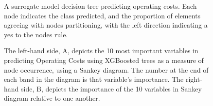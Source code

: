 \documentclass[review,12pt,authoryear]{elsarticle}
\begin{document}
\begin{linenumbers}
\begin{figure} 
  \caption{A surrogate model decision tree predicting operating costs. Each node indicates the class predicted, and the proportion of elements agreeing with nodes partitioning, with the left direction indicating a yes to the nodes rule.}\label{fig:operating_tree}
 \end{figure}

\begin{figure}
  \caption{The left-hand side, A,  depicts the 10 most important variables in predicting Operating Costs using XGBoosted trees as a measure of node occurrence, using a Sankey diagram. The number at the end of each band in the diagram is that variable's importance. The right-hand side, B, depicts the importance of the 10 variables in Sankey diagram relative to one another.}\label{fig:operating_costs_sankey}
 \end{figure}
 

\end{linenumbers}
\end{document}
